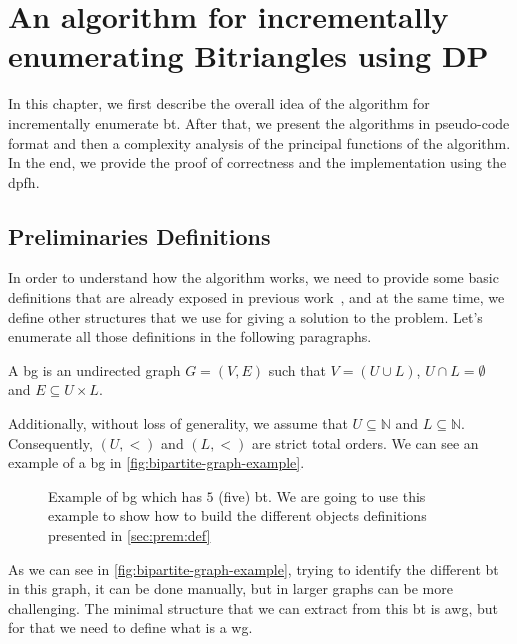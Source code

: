 \chapter[An Algorithm for Incrementally Enummerating Bitriangles]{An algorithm for incrementally enumerating Bitriangles using DP}\label{incr-algo-bt-dp}
In this chapter, we first describe the overall idea of the algorithm for incrementally enumerate 
\acrfull{bt}. After that, we present the algorithms in pseudo-code format and then a complexity analysis of the principal functions of the algorithm.
In the end, we provide the proof of correctness and the implementation using the \acrshort{dpfh}.  

\section{Preliminaries Definitions}\label{sec:prem:def}
In order to understand how the algorithm works, we need to provide some basic definitions that are already exposed in previous work~\cite{btcount}, and
at the same time, we define other structures that we use for giving a solution to the problem.
Let's enumerate all those definitions in the following paragraphs.

\begin{definition}[\acrlong{bg}] 
A \acrfull{bg} is an undirected graph $G=(V,E)$  such that $V=(U\cup L)$, $U\cap L=\emptyset$ and $E\subseteq U\times L$.\cite{Bondy1976}
\end{definition}

Additionally, without loss of generality, we assume that  $U\subseteq \mathbb{N}$ and $L\subseteq \mathbb{N}$. Consequently, $(U,<)$  and $(L,<)$ are strict total orders. We can see an example of a \acrshort{bg}
in \autoref{fig:bipartite-graph-example}.

\begin{figure}[ht]
\centering	
{}
\caption[{[\acrshort{iebt}] Example of \acrlong{bg}}]{Example of \acrlong{bg} which has $5$ (five) \acrshort{bt}. We are going to use this example to show how to build the different objects definitions presented in \autoref{sec:prem:def}}
\label{fig:bipartite-graph-example}
\end{figure}

As we can see in \autoref{fig:bipartite-graph-example}, trying to identify the different \acrshort{bt} in this graph, it can be done manually, but in larger graphs can be more challenging.
The minimal structure that we can extract from this \acrshort{bt} is \acrlong{awg}, but for that we need to define what is a \acrfull{wg}.

